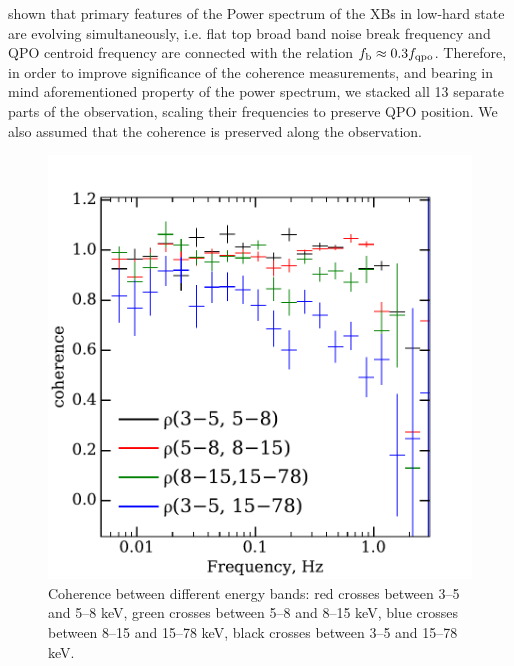\documentclass[a4paper,fleqn,usenatbib]{mnras}
\def\grs{{GRS\,1739--278\,}}
\begin{document}
\citet{wijnands99} shown that primary features of the Power spectrum of the XBs in low-hard state are evolving simultaneously, i.e. flat top broad band noise break frequency and QPO centroid frequency are connected with the relation $f_{\rm b} \approx 0.3 f_{\rm qpo}$.
Therefore, in order to improve significance of the coherence measurements, and bearing in mind aforementioned property of the power spectrum, we stacked all 13 separate parts of the observation, scaling their frequencies to preserve QPO position. 
We also assumed that the coherence is preserved along the observation. %


\begin{figure}
    \includegraphics[width=\columnwidth]{coherence_4.pdf}
    \caption{Coherence between different energy bands:  red crosses between 3--5 and 5--8 keV,
     green crosses between 5--8 and 8--15 keV, blue crosses between 8--15 and 15--78 keV, black crosses between 3--5 and 15--78 keV.}
    \label{fig:coherence}
\end{figure}

\end{document}
